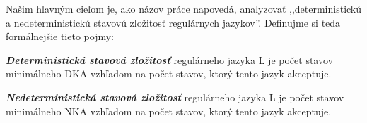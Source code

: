 Našim hlavným cieľom je, ako názov práce napovedá, analyzovať ,,deterministickú a nedeterministickú stavovú zložitosť regulárnych jazykov''. Definujme si teda formálnejšie tieto pojmy:

\begin{defn}{\textbf {\textit {Deterministická stavová zložitosť}}} regulárneho jazyka L je počet stavov minimálneho DKA vzhľadom na počet stavov, ktorý tento jazyk akceptuje.
\end{defn}

\begin{defn}{\textbf {\textit {Nedeterministická stavová zložitosť}}}  regulárneho jazyka L je počet stavov minimálneho NKA vzhľadom na počet stavov, ktorý tento jazyk akceptuje.
\end{defn}